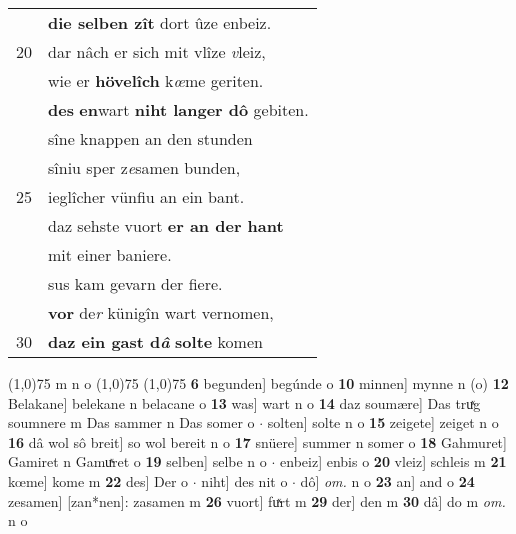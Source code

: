 \documentclass[8pt,a4paper,notitlepage]{article}
\begin{document}
\begin{table}[ht]
\begin{minipage}[t]{0.5\linewidth}
\begin{tabular}{rl}
 & \textbf{die selben zît} dort ûze enbeiz.\\ 
20 & dar nâch er sich mit vlîze \textit{v}leiz,\\ 
 & wie er \textbf{hövelîch} k\textit{œ}me geriten.\\ 
 & \textbf{des} \textbf{en}wart \textbf{niht langer dô} gebiten.\\ 
 & sîne knappen an den stunden\\ 
 & sîniu sper z\textit{e}samen bunden,\\ 
25 & ieglîcher vünfiu an ein bant.\\ 
 & daz sehste vuort \textbf{er an der hant}\\ 
 & mit einer baniere.\\ 
 & sus kam gevarn der fiere.\\ 
 & \textbf{vor} de\textit{r} künigîn wart vernomen,\\ 
30 & \textbf{daz ein gast d\textit{â}} \textbf{solte} komen\\ 
\end{tabular}
\scriptsize
\line(1,0){75} \newline
m n o \newline
\line(1,0){75} \newline
\newline
\line(1,0){75} \newline
\textbf{6} begunden] begúnde o \textbf{10} minnen] mynne n (o) \textbf{12} Belakane] belekane n belacane o \textbf{13} was] wart n o \textbf{14} daz soumære] Das truͯg soumnere m Das sammer n Das somer o  $\cdot$ solten] solte n o \textbf{15} zeigete] zeiget n o \textbf{16} dâ wol sô breit] so wol bereit n o \textbf{17} snüere] summer n somer o \textbf{18} Gahmuret] Gamiret n Gamuͯret o \textbf{19} selben] selbe n o  $\cdot$ enbeiz] enbis o \textbf{20} vleiz] schleis m \textbf{21} kœme] kome m \textbf{22} des] Der o  $\cdot$ niht] des nit o  $\cdot$ dô] \textit{om.} n o \textbf{23} an] and o \textbf{24} zesamen] [zan*nen]: zasamen m \textbf{26} vuort] fuͯrt m \textbf{29} der] den m \textbf{30} dâ] do m \textit{om.} n o \newline
\end{minipage}
\end{table}
\newpage
\end{document}
